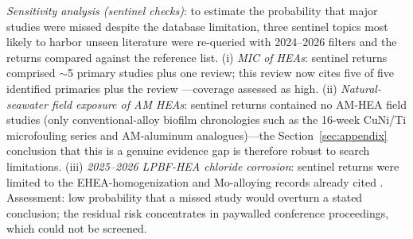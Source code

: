 \emph{Sensitivity analysis (sentinel checks)}: to estimate the probability that major studies were missed despite the database limitation, three sentinel topics most likely to harbor unseen literature were re-queried with 2024--2026 filters and the returns compared against the reference list. (i) \emph{MIC of HEAs}: sentinel returns comprised $\sim$5 primary studies plus one review; this review now cites five of five identified primaries plus the review \cite{lou2020mic,mic_cantor2022,wang2023srb,lou2024cuhea,antimic_hea_review2025}---coverage assessed as high. (ii) \emph{Natural-seawater field exposure of AM HEAs}: sentinel returns contained no AM-HEA field studies (only conventional-alloy biofilm chronologies such as the 16-week CuNi/Ti microfouling series \cite{vadde2025} and AM-aluminum analogues)---the Section~\ref{sec:appendix} conclusion that this is a genuine evidence gap is therefore robust to search limitations. (iii) \emph{2025--2026 LPBF-HEA chloride corrosion}: sentinel returns were limited to the EHEA-homogenization and Mo-alloying records already cited \cite{slm_ehea_2025,mo_ehea_2026}. Assessment: low probability that a missed study would overturn a stated conclusion; the residual risk concentrates in paywalled conference proceedings, which could not be screened.
